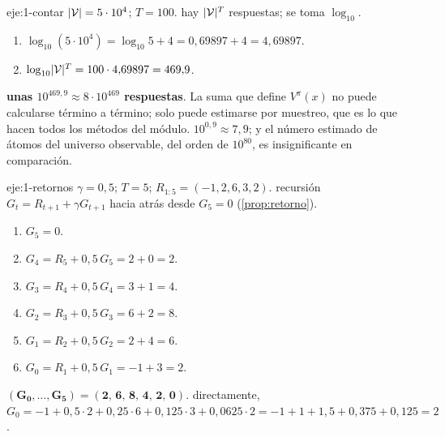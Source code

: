 \begin{solucion}{eje:1-contar}
\datos $\lvert\mathcal{V}\rvert=5\cdot 10^{4}$; $T=100$.
\planteamiento hay $\lvert\mathcal{V}\rvert^{T}$ respuestas; se toma $\log_{10}$.
\pasos
\begin{enumerate}[label=\arabic*.]
  \item $\log_{10}(5\cdot 10^{4})=\log_{10}5+4=0{,}69897+4=4{,}69897$.
  \item $\log_{10}\lvert\mathcal{V}\rvert^{T}=100\cdot 4{,}69897=469{,}9$.
\end{enumerate}
\resultado \textbf{unas $10^{469{,}9}\approx 8\cdot 10^{469}$ respuestas}. La suma que define $V^{\pi}(x)$ no puede calcularse término a término; solo puede estimarse por muestreo, que es lo que hacen todos los métodos del módulo.
\comprobacion $10^{0{,}9}\approx 7{,}9$; y el número estimado de átomos del universo observable, del orden de $10^{80}$, es insignificante en comparación.
\end{solucion}

\begin{solucion}{eje:1-retornos}
\datos $\gamma=0{,}5$; $T=5$; $R_{1:5}=(-1,2,6,3,2)$.
\planteamiento recursión $G_t=R_{t+1}+\gamma G_{t+1}$ hacia atrás desde $G_5=0$ (\cref{prop:retorno}).
\pasos
\begin{enumerate}[label=\arabic*.]
  \item $G_5=0$.
  \item $G_4=R_5+0{,}5\,G_5=2+0=2$.
  \item $G_3=R_4+0{,}5\,G_4=3+1=4$.
  \item $G_2=R_3+0{,}5\,G_3=6+2=8$.
  \item $G_1=R_2+0{,}5\,G_2=2+4=6$.
  \item $G_0=R_1+0{,}5\,G_1=-1+3=2$.
\end{enumerate}
\resultado $\mathbf{(G_0,\dots,G_5)=(2,\,6,\,8,\,4,\,2,\,0)}$.
\comprobacion directamente, $G_0=-1+0{,}5\cdot 2+0{,}25\cdot 6+0{,}125\cdot 3+0{,}0625\cdot 2=-1+1+1{,}5+0{,}375+0{,}125=2$.
\end{solucion}

